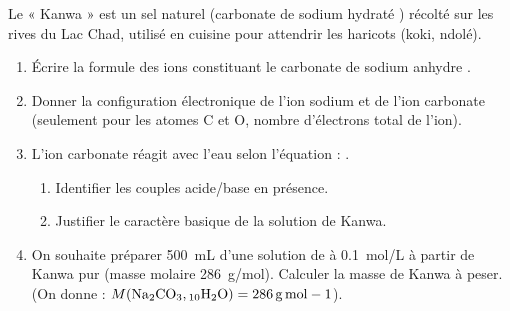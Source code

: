 \documentclass[11pt]{article}
\begin{document}
\begin{exercice}
Le « Kanwa » est un sel naturel (carbonate de sodium hydraté ) récolté sur les rives du Lac Chad, utilisé en cuisine pour attendrir les haricots (koki, ndolé).
\begin{enumerate}
    \item Écrire la formule des ions constituant le carbonate de sodium anhydre .
    \item Donner la configuration électronique de l'ion sodium  et de l'ion carbonate  (seulement pour les atomes C et O, nombre d'électrons total de l'ion).
    \item L'ion carbonate réagit avec l'eau selon l'équation : .
    \begin{enumerate}
        \item Identifier les couples acide/base en présence.
        \item Justifier le caractère basique de la solution de Kanwa.
    \end{enumerate}
    \item On souhaite préparer \SI{500}{mL} d'une solution de  à \SI{0,1}{mol/L} à partir de Kanwa pur (masse molaire \SI{286}{g/mol}). Calculer la masse de Kanwa à peser. (On donne : $M(\ce{Na2CO3,10H2O}) = \SI{286}{g.mol-1}$).
\end{enumerate}
\end{exercice}
\end{document}
